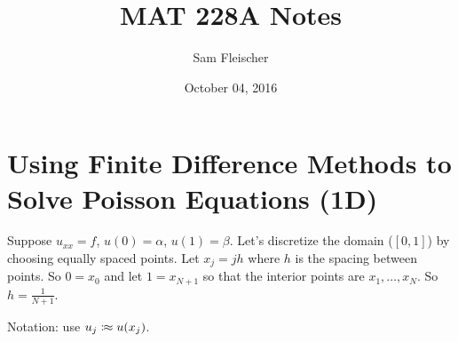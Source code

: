 \documentclass{article}
\title{MAT 228A Notes}
\author{Sam Fleischer}
\date{October 04, 2016}
\begin{document}
    \maketitle

    \section{Using Finite Difference Methods to Solve Poisson Equations (1D)}
        Suppose $u_{xx} = f$, $u(0) = \alpha$, $u(1) = \beta$.  Let's discretize the domain ($[0,1]$) by choosing equally spaced points.  Let $x_j = jh$ where $h$ is the spacing between points.  So $0 = x_0$ and let $1 = x_{N+1}$ so that the interior points are $x_1,\dots, x_N$.  So $h = \frac{1}{N+1}$.

        Notation: use $u_j \colonapprox u(x_j)$.
\end{document}
